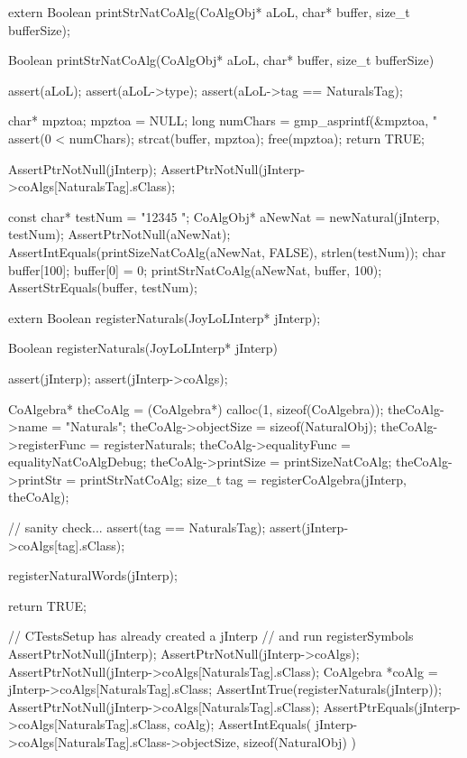 \startCHeader
extern Boolean printStrNatCoAlg(CoAlgObj* aLoL,
                                char* buffer, size_t bufferSize);
\stopCHeader

\startCCode
Boolean printStrNatCoAlg(CoAlgObj* aLoL,
                         char* buffer, size_t bufferSize) {
  assert(aLoL);
  assert(aLoL->type);
  assert(aLoL->tag == NaturalsTag);

  char* mpztoa;
  mpztoa = NULL;
  long numChars = gmp_asprintf(&mpztoa, "%
  assert(0 < numChars);
  strcat(buffer, mpztoa);
  free(mpztoa);
  return TRUE;
}
\stopCCode


\startCTest
  AssertPtrNotNull(jInterp);
  AssertPtrNotNull(jInterp->coAlgs[NaturalsTag].sClass);

  const char* testNum = "12345 ";
  CoAlgObj* aNewNat = newNatural(jInterp, testNum);
  AssertPtrNotNull(aNewNat);
  AssertIntEquals(printSizeNatCoAlg(aNewNat, FALSE), strlen(testNum));
  char buffer[100];
  buffer[0] = 0;
  printStrNatCoAlg(aNewNat, buffer, 100);
  AssertStrEquals(buffer, testNum);
\stopCTest
\stopTestCase
\stopTestSuite

\startTestSuite[registerSymbols]

\startCHeader
extern Boolean registerNaturals(JoyLoLInterp* jInterp);
\stopCHeader
{}

\startCCode
Boolean registerNaturals(JoyLoLInterp* jInterp) {
  assert(jInterp);
  assert(jInterp->coAlgs);
  
  CoAlgebra* theCoAlg    = (CoAlgebra*) calloc(1, sizeof(CoAlgebra));
  theCoAlg->name         = "Naturals";
  theCoAlg->objectSize   = sizeof(NaturalObj);
  theCoAlg->registerFunc = registerNaturals;
  theCoAlg->equalityFunc = equalityNatCoAlgDebug;
  theCoAlg->printSize    = printSizeNatCoAlg;
  theCoAlg->printStr     = printStrNatCoAlg;
  size_t tag = registerCoAlgebra(jInterp, theCoAlg);
  
  // sanity check...
  assert(tag == NaturalsTag);
  assert(jInterp->coAlgs[tag].sClass);

  registerNaturalWords(jInterp);

  return TRUE;
}
\stopCCode


\startCTest
  // CTestsSetup has already created a jInterp
  // and run registerSymbols
  AssertPtrNotNull(jInterp);
  AssertPtrNotNull(jInterp->coAlgs);
  AssertPtrNotNull(jInterp->coAlgs[NaturalsTag].sClass);
  CoAlgebra *coAlg = jInterp->coAlgs[NaturalsTag].sClass;
  AssertIntTrue(registerNaturals(jInterp));
  AssertPtrNotNull(jInterp->coAlgs[NaturalsTag].sClass);
  AssertPtrEquals(jInterp->coAlgs[NaturalsTag].sClass, coAlg);
  AssertIntEquals(
    jInterp->coAlgs[NaturalsTag].sClass->objectSize,
    sizeof(NaturalObj)
  )
\stopCTest
\stopTestCase
\stopTestSuite
